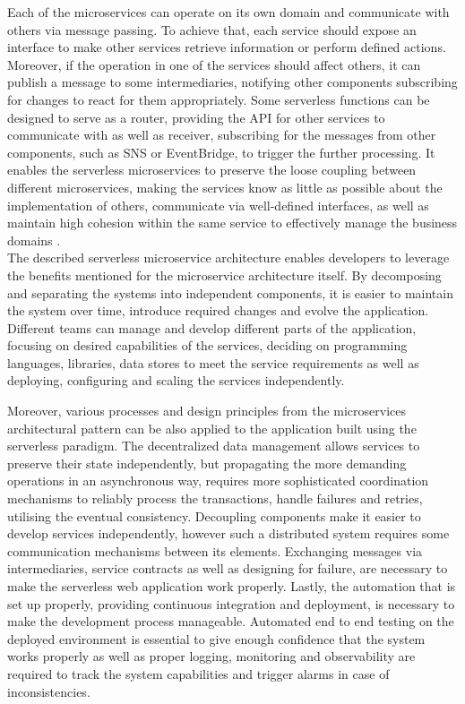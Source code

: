 Each of the microservices can operate on its own domain and communicate with others via message passing.
To achieve that, each service should expose an interface to make other services retrieve information or perform defined actions.
Moreover, if the operation in one of the services should affect others, it can publish a message to some intermediaries, notifying other components subscribing for changes to react for them appropriately.
Some serverless functions can be designed to serve as a router, providing the API for other services to communicate with as well as receiver, subscribing for the messages from other components, such as SNS or EventBridge, to trigger the further processing.
It enables the serverless microservices to preserve the loose coupling between different microservices, making the services know as little as possible about the implementation of others, communicate via well-defined interfaces, as well as maintain high cohesion within the same service to effectively manage the business domains \cite{AnIntroductionToServerlessMicroservices}. \\

The described serverless microservice architecture enables developers to leverage the benefits mentioned for the microservice architecture itself.
By decomposing and separating the systems into independent components, it is easier to maintain the system over time, introduce required changes and evolve the application. Different teams can manage and develop different parts of the application, focusing on desired capabilities of the services, deciding on programming languages, libraries, data stores to meet the service requirements as well as deploying, configuring and scaling the services independently.

Moreover, various processes and design principles from the microservices architectural pattern can be also applied to the application built using the serverless paradigm.
The decentralized data management allows services to preserve their state independently, but propagating the more demanding operations in an asynchronous way, requires more sophisticated coordination mechanisms to reliably process the transactions, handle failures and retries, utilising the eventual consistency.
Decoupling components make it easier to develop services independently, however such a distributed system requires some communication mechanisms between its elements.
Exchanging messages via intermediaries, service contracts as well as designing for failure, are necessary to make the serverless web application work properly.
Lastly, the automation that is set up properly, providing continuous integration and deployment, is necessary to make the development process manageable.
Automated end to end testing on the deployed environment is essential to give enough confidence that the system works properly as well as proper logging, monitoring and observability are required to track the system capabilities and trigger alarms in case of inconsistencies. \\

